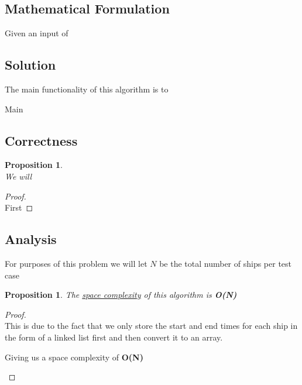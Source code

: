 \documentclass[12pt]{article}
\newtheorem{proposition}[theorem]{Proposition}
\begin{document}
\subsection{Mathematical Formulation}
Given an input of

\newpage

\subsection{Solution}
The main functionality of this algorithm is to

\begin{algorithm}[H]
\caption{Main}
\begin{algorithmic}
        \EndFor
    \EndProcedure
\end{algorithmic}
\end{algorithm}



\subsection{Correctness}
\begin{proposition}
~ \\ \indent We will
\end{proposition}

\begin{proof}
~ \\ \indent First
\end{proof}


\subsection{Analysis}
For purposes of this problem we will let $N$ be the total number of ships per test case

\begin{proposition}
\label{numq}
The \underline{space complexity} of this algorithm is \textbf{O(N)}
\end{proposition}

\begin{proof}
~ \\ \indent This is due to the fact that we only store the start and end times for each ship
in the form of a linked list first and then convert it to an array.
\begin{center}
    Giving us a space complexity of \textbf{O(N)}
\end{center}
\end{proof}
\end{document}
